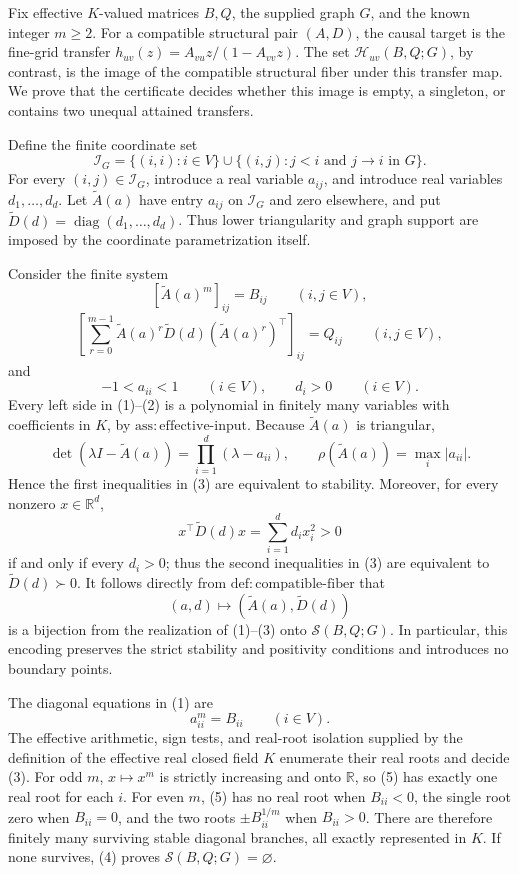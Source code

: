 Fix effective \(K\)-valued matrices \(B,Q\), the supplied graph \(G\), and the known integer \(m\geq2\).  For a compatible structural pair \((A,D)\), the causal target is the fine-grid transfer \(h_{uv}(z)=A_{vu}z/(1-A_{vv}z)\).  The set \(\mathcal H_{uv}(B,Q;G)\), by contrast, is the image of the compatible structural fiber under this transfer map.  We prove that the certificate decides whether this image is empty, a singleton, or contains two unequal attained transfers.

Define the finite coordinate set
\[
 \mathcal I_G
 =\{(i,i):i\in V\}\cup
   \{(i,j):j<i\text{ and }j\to i\text{ in }G\}.
\]
For every \((i,j)\in\mathcal I_G\), introduce a real variable \(a_{ij}\), and introduce real variables \(d_1,\ldots,d_d\).  Let \(\widetilde A(a)\) have entry \(a_{ij}\) on \(\mathcal I_G\) and zero elsewhere, and put \(\widetilde D(d)=\operatorname{diag}(d_1,\ldots,d_d)\).  Thus lower triangularity and graph support are imposed by the coordinate parametrization itself.

Consider the finite system
\[
 [\widetilde A(a)^m]_{ij}=B_{ij}\qquad(i,j\in V),                 \tag{1}
\]
\[
 \left[\sum_{r=0}^{m-1}\widetilde A(a)^r\widetilde D(d)
                    (\widetilde A(a)^r)^\top\right]_{ij}
 =Q_{ij}\qquad(i,j\in V),                                        \tag{2}
\]
and
\[
 -1<a_{ii}<1\qquad(i\in V),
 \qquad d_i>0\qquad(i\in V).                                    \tag{3}
\]
Every left side in (1)--(2) is a polynomial in finitely many variables with coefficients in \(K\), by \(\mathrm{ass{:}effective\mbox{-}input}\).  Because \(\widetilde A(a)\) is triangular,
\[
 \det(\lambda I-\widetilde A(a))=\prod_{i=1}^d(\lambda-a_{ii}),
 \qquad \rho(\widetilde A(a))=\max_i|a_{ii}|.
\]
Hence the first inequalities in (3) are equivalent to stability.  Moreover, for every nonzero \(x\in\mathbb R^d\),
\[
 x^\top\widetilde D(d)x=\sum_{i=1}^d d_i x_i^2>0
\]
if and only if every \(d_i>0\); thus the second inequalities in (3) are equivalent to \(\widetilde D(d)\succ0\).  It follows directly from \(\mathrm{def{:}compatible\mbox{-}fiber}\) that
\[
 (a,d)\longmapsto (\widetilde A(a),\widetilde D(d))               \tag{4}
\]
is a bijection from the realization of (1)--(3) onto \(\mathcal S(B,Q;G)\).  In particular, this encoding preserves the strict stability and positivity conditions and introduces no boundary points.

The diagonal equations in (1) are
\[
 a_{ii}^{m}=B_{ii}\qquad(i\in V).                                \tag{5}
\]
The effective arithmetic, sign tests, and real-root isolation supplied by the definition of the effective real closed field \(K\) enumerate their real roots and decide (3).  For odd \(m\), \(x\mapsto x^m\) is strictly increasing and onto \(\mathbb R\), so (5) has exactly one real root for each \(i\).  For even \(m\), (5) has no real root when \(B_{ii}<0\), the single root zero when \(B_{ii}=0\), and the two roots \(\pm B_{ii}^{1/m}\) when \(B_{ii}>0\).  There are therefore finitely many surviving stable diagonal branches, all exactly represented in \(K\).  If none survives, (4) proves \(\mathcal S(B,Q;G)=\varnothing\).

